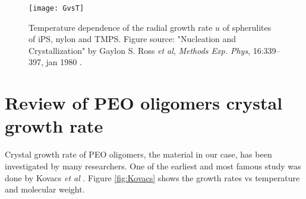 \begin{figure}[H]
\center
\texttt{[image: GvsT]}
\caption[Temperature dependence of the radial growth rate $u$ of spherulites of iPS, nylon and TMPS.]{Temperature dependence of the radial growth rate $u$ of spherulites of iPS, nylon and TMPS. Figure source: "Nucleation and Crystallization" by Gaylon S. Ross \textit{et al}, \textit{Methods Exp. Phys}, 16:339–397, jan 1980 \cite{Ross1980}.}
\label{fig:growth rate vs T}
\end{figure}




\section{Review of PEO oligomers crystal growth rate}

Crystal growth rate of PEO oligomers, the material in our case, has been investigated by many researchers. One of the earliest and most famous study was done by Kovacs \textit{et al} \cite{Kovacs1975}. Figure \ref{fig:Kovacs} shows the growth rates vs temperature and molecular weight.

